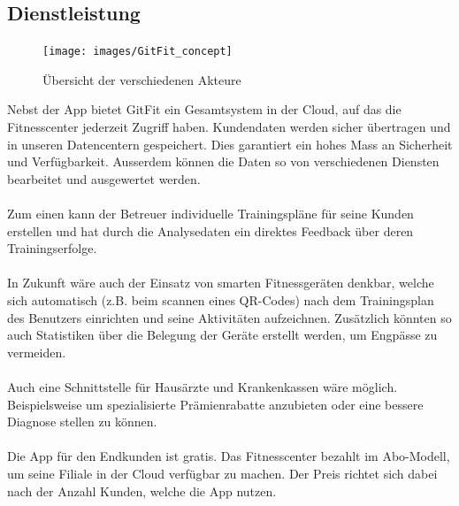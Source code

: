 \subsection{Dienstleistung}
\begin{figure}[h]
	\centering
	\texttt{[image: images/GitFit\_concept]}
	\caption{Übersicht der verschiedenen Akteure}
	\label{fig:GitFit_concept}
\end{figure}
Nebst der App bietet GitFit ein Gesamtsystem in der Cloud, auf das die Fitnesscenter jederzeit Zugriff haben. Kundendaten werden sicher übertragen und in unseren Datencentern gespeichert. Dies garantiert ein hohes Mass an Sicherheit und Verfügbarkeit. Ausserdem können die Daten so von verschiedenen Diensten bearbeitet und ausgewertet werden. \\ \\
Zum einen kann der Betreuer individuelle Trainingspläne für seine Kunden erstellen und hat durch die Analysedaten ein direktes Feedback über deren Trainingserfolge. \\ \\
In Zukunft wäre auch der Einsatz von smarten Fitnessgeräten denkbar, welche sich automatisch (z.B. beim scannen eines QR-Codes) nach dem Trainingsplan des Benutzers einrichten und seine Aktivitäten aufzeichnen.
Zusätzlich könnten so auch Statistiken über die Belegung der Geräte erstellt werden, um Engpässe zu vermeiden. \\ \\
Auch eine Schnittstelle für Hausärzte und Krankenkassen wäre möglich. Beispielsweise um spezialisierte Prämienrabatte anzubieten oder eine bessere Diagnose stellen zu können. \\ \\
Die App für den Endkunden ist gratis. Das Fitnesscenter bezahlt im Abo-Modell, um seine Filiale in der Cloud verfügbar zu machen. Der Preis richtet sich dabei nach der Anzahl Kunden, welche die App nutzen.


